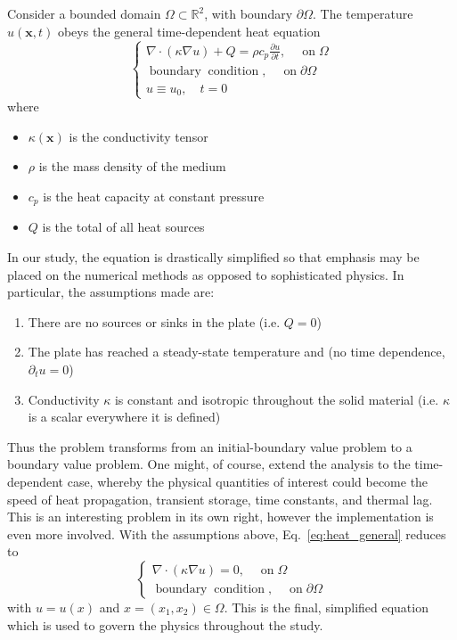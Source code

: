 \documentclass{article}
\newcommand{\tmmathbf}[1]{\ensuremath{\boldsymbol{#1}}}
\newcommand{\tmop}[1]{\ensuremath{\operatorname{#1}}}
\newenvironment{enumeratenumeric}{\begin{enumerate}[1.] }{\end{enumerate}}
\begin{document}
Consider a bounded domain $\Omega \subset \mathbb{R}^2 $, with boundary
$\partial \Omega$. The temperature $u (\tmmathbf{x}, t)$ obeys the general
time-dependent heat equation
\begin{equation}
  \label{eq:heat_general}
  \left\{ \begin{array}{c}
    \nabla \cdot (\kappa \nabla u) + Q = \rho c_p \frac{\partial u}{\partial
    t}, \quad \tmop{on} \Omega\\
    \tmop{boundary} \tmop{condition}, \quad \tmop{on} \partial \Omega \\
    u\equiv u_0, \quad t=0
  \end{array} \right.
\end{equation}
where
\begin{itemize}
  \item $\kappa (\tmmathbf{x})$ is the conductivity tensor
  
  \item $\rho$ is the mass density of the medium
  
  \item $c_p$ is the heat capacity at constant pressure
  
  \item $Q$ is the total of all heat sources
\end{itemize}
In our study, the equation is drastically simplified so that emphasis may be
placed on the numerical methods as opposed to sophisticated physics.
In particular, the assumptions made are:
\begin{enumeratenumeric}
  \item There are no sources or sinks in the plate (i.e. $Q = 0$)
  
  \item The plate has reached a steady-state temperature and (no time dependence,
  $\partial_t u = 0$)
  
  \item Conductivity $\kappa$ is constant and isotropic throughout the solid
  material (i.e. $\kappa$ is a scalar everywhere it is defined)
\end{enumeratenumeric}
Thus the problem transforms from an initial-boundary value problem to a boundary value problem. One might, of course, extend the analysis to the time-dependent case, whereby
the physical quantities of interest could become the speed of heat
propagation, transient storage, time constants, and thermal lag. This is an
interesting problem in its own right, however the implementation is even more
involved. With the assumptions above, Eq.~\eqref{eq:heat_general} reduces to
\begin{equation}
  \label{eq:heat_steady}
  \left\{ \begin{array}{c}
    \nabla \cdot (\kappa \nabla u) = 0, \quad \tmop{on} \Omega\\
    \tmop{boundary} \tmop{condition}, \quad \tmop{on} \partial \Omega
  \end{array} \right.
\end{equation}
with $u = u (x)$ and $x = (x_1, x_2) \in \Omega$. This is the final, simplified equation which is used to
govern the physics throughout the study.
\end{document}
